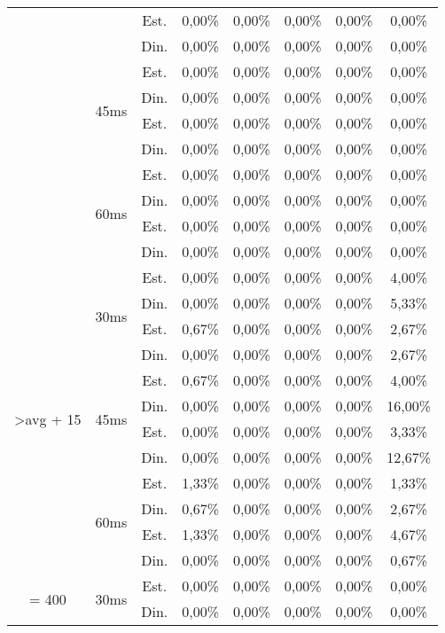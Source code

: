 \begin{center}
\begin{longtable}{|c|c|c|ccccc|}
 &  & Est. & 0,00\% & 0,00\% & 0,00\% & 0,00\% & 0,00\% \\
 &  & Din. & 0,00\% & 0,00\% & 0,00\% & 0,00\% & 0,00\% \\ \cline{2-8} 
 & \multirow{4}{*}{45ms} & Est. & 0,00\% & 0,00\% & 0,00\% & 0,00\% & 0,00\% \\
 &  & Din. & 0,00\% & 0,00\% & 0,00\% & 0,00\% & 0,00\% \\
 &  & Est. & 0,00\% & 0,00\% & 0,00\% & 0,00\% & 0,00\% \\
 &  & Din. & 0,00\% & 0,00\% & 0,00\% & 0,00\% & 0,00\% \\ \cline{2-8} 
 & \multirow{4}{*}{60ms} & Est. & 0,00\% & 0,00\% & 0,00\% & 0,00\% & 0,00\% \\
 &  & Din. & 0,00\% & 0,00\% & 0,00\% & 0,00\% & 0,00\% \\
 &  & Est. & 0,00\% & 0,00\% & 0,00\% & 0,00\% & 0,00\% \\
 &  & Din. & 0,00\% & 0,00\% & 0,00\% & 0,00\% & 0,00\% \\ \hline
\multirow{12}{*}{\textgreater avg + 15} & \multirow{4}{*}{30ms} & Est. & 0,00\% & 0,00\% & 0,00\% & 0,00\% & 4,00\% \\
 &  & Din. & 0,00\% & 0,00\% & 0,00\% & 0,00\% & 5,33\% \\
 &  & Est. & 0,67\% & 0,00\% & 0,00\% & 0,00\% & 2,67\% \\
 &  & Din. & 0,00\% & 0,00\% & 0,00\% & 0,00\% & 2,67\% \\ \cline{2-8} 
 & \multirow{4}{*}{45ms} & Est. & 0,67\% & 0,00\% & 0,00\% & 0,00\% & 4,00\% \\
 &  & Din. & 0,00\% & 0,00\% & 0,00\% & 0,00\% & 16,00\% \\
 &  & Est. & 0,00\% & 0,00\% & 0,00\% & 0,00\% & 3,33\% \\
 &  & Din. & 0,00\% & 0,00\% & 0,00\% & 0,00\% & 12,67\% \\ \cline{2-8} 
 & \multirow{4}{*}{60ms} & Est. & 1,33\% & 0,00\% & 0,00\% & 0,00\% & 1,33\% \\
 &  & Din. & 0,67\% & 0,00\% & 0,00\% & 0,00\% & 2,67\% \\
 &  & Est. & 1,33\% & 0,00\% & 0,00\% & 0,00\% & 4,67\% \\
 &  & Din. & 0,00\% & 0,00\% & 0,00\% & 0,00\% & 0,67\% \\ \hline
\multirow{12}{*}{= 400} & \multirow{4}{*}{30ms} & Est. & 0,00\% & 0,00\% & 0,00\% & 0,00\% & 0,00\% \\
 &  & Din. & 0,00\% & 0,00\% & 0,00\% & 0,00\% & 0,00\% \\

\end{longtable}
\end{center}

